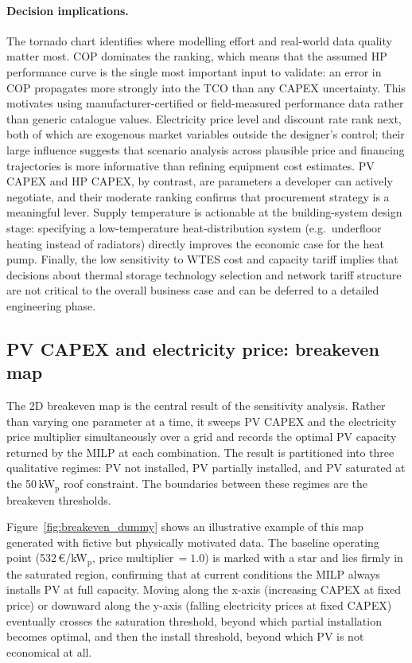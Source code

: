 \documentclass[11pt,a4paper]{report}
\begin{document}
\paragraph{Decision implications.}
The tornado chart identifies where modelling effort and real-world data
quality matter most.
COP dominates the ranking, which means that the assumed HP performance
curve is the single most important input to validate: an error in COP
propagates more strongly into the TCO than any CAPEX uncertainty.
This motivates using manufacturer-certified or field-measured performance
data rather than generic catalogue values.
Electricity price level and discount rate rank next, both of which are
exogenous market variables outside the designer's control; their large
influence suggests that scenario analysis across plausible price and
financing trajectories is more informative than refining equipment cost
estimates.
PV CAPEX and HP CAPEX, by contrast, are parameters a developer can
actively negotiate, and their moderate ranking confirms that procurement
strategy is a meaningful lever.
Supply temperature is actionable at the building-system design stage:
specifying a low-temperature heat-distribution system (e.g.\ underfloor
heating instead of radiators) directly improves the economic case for the
heat pump.
Finally, the low sensitivity to WTES cost and capacity tariff implies that
decisions about thermal storage technology selection and network tariff
structure are not critical to the overall business case and can be
deferred to a detailed engineering phase.

\subsection{PV CAPEX and electricity price: breakeven map}
\label{sub:sens_pv_breakeven}

The 2D breakeven map is the central result of the sensitivity analysis.
Rather than varying one parameter at a time, it sweeps PV CAPEX and the electricity
price multiplier simultaneously over a grid and records the optimal PV capacity
returned by the MILP at each combination.
The result is partitioned into three qualitative regimes: PV not installed, PV
partially installed, and PV saturated at the 50\,kW$_\mathrm{p}$ roof constraint.
The boundaries between these regimes are the breakeven thresholds.

Figure~\ref{fig:breakeven_dummy} shows an illustrative example of this map generated
with fictive but physically motivated data.
The baseline operating point (532\,\euro/kW$_\mathrm{p}$, price multiplier\,$= 1.0$)
is marked with a star and lies firmly in the saturated region, confirming that at
current conditions the MILP always installs PV at full capacity.
Moving along the x-axis (increasing CAPEX at fixed price) or downward along the y-axis
(falling electricity prices at fixed CAPEX) eventually crosses the saturation threshold,
beyond which partial installation becomes optimal, and then the install threshold,
beyond which PV is not economical at all.
\end{document}
